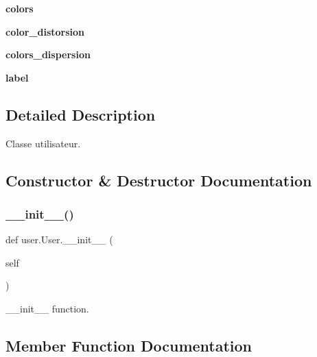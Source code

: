 \begin{DoxyCompactItemize}
\mbox{\label{classuser_1_1_user_aab2a5bfc38a04a549b34e9dd2e7216e5}} 
{\bfseries colors}
\item 
\mbox{\label{classuser_1_1_user_a52f95c80145dab806b28bf825223ca74}} 
{\bfseries color\+\_\+distorsion}
\item 
\mbox{\label{classuser_1_1_user_a9ddb37752ef26c665dba7d0fbbeb094e}} 
{\bfseries colors\+\_\+dispersion}
\item 
\mbox{\label{classuser_1_1_user_ad680260b05eb361e7062950112676ae0}} 
{\bfseries label}
\end{DoxyCompactItemize}


\subsection{Detailed Description}
\begin{DoxyVerb}Classe utilisateur.
\end{DoxyVerb}
 

\subsection{Constructor \& Destructor Documentation}
\mbox{\label{classuser_1_1_user_a25681f18d7857cac8117612e68c92cc5}} 
\subsubsection{\texorpdfstring{\+\_\+\+\_\+init\+\_\+\+\_\+()}{\_\_init\_\_()}}
{\footnotesize\ttfamily def user.\+User.\+\_\+\+\_\+init\+\_\+\+\_\+ (\begin{DoxyParamCaption}\item[{}]{self }\end{DoxyParamCaption})}

\begin{DoxyVerb}__init__ function.
\end{DoxyVerb}
 

\subsection{Member Function Documentation}
\mbox{\label{classuser_1_1_user_a817542763611c0dd2d4ae4efc997f079}} 
